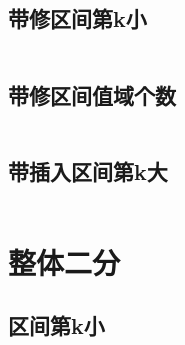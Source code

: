 \documentclass[a4paper,12pt]{article}
\begin{document}
\subsection*{带修区间第k小}
\inputminted[]{c++}{code/luoguP2617.cpp}
\subsection*{带修区间值域个数}
\inputminted[]{c++}{code/19ncI.cpp}
\subsection*{带插入区间第k大}
\inputminted[]{c++}{code/luoguP3332.cpp}
\section*{整体二分}
\subsection*{区间第k小}
\inputminted[]{c++}{code/luoguP3834.cpp}





\end{document}
